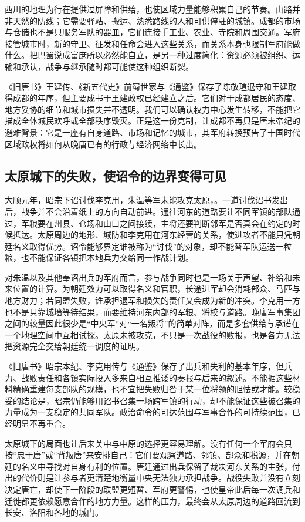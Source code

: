 西川的地理为行在提供过屏障和供给，也使区域力量能够积累自己的节奏。山路并非天然的防线；它需要驿站、搬运、熟悉路线的人和可供停驻的城镇。成都的市场与仓储也不是只服务军队的器皿，它们连接手工业、农业、寺院和周围交通。军府接管城市时，新的守卫、征发和任命会进入这些关系，而关系本身也限制军府能做什么。把巴蜀说成富庶所以必然能自立，是另一种过度简化：资源必须被组织、运输和承认，战争与继承随时都可能使这种组织断裂。

《旧唐书》王建传、《新五代史》前蜀世家与《通鉴》保存了陈敬瑄退守和王建取得成都的年序，但主要成书于王建政权已经建立之后。它们对于成都居民的态度、地方妥协的细节和城市损失并不透明。我们可以确认权力中心发生转移，不能把它描成全体城民欢呼或全部秩序毁灭。正是这一份克制，让成都不再只是唐末帝纪的避难背景：它是一座有自身道路、市场和记忆的城市，其军府转换预告了十国时代区域政权将如何从晚唐已有的行政与经济网络中长出。

\subsection{太原城下的失败，使诏令的边界变得可见}
大顺元年，昭宗下诏讨伐李克用，朱温等军未能攻克太原，。一道讨伐诏书发出后，战争并不会沿着纸上的方向自动前进。通往河东的道路要让不同军镇的部队通过，军粮要在州县、仓场和山口之间接续，主将还要判断邻军是否真会在约定的时候抵达。太原周边的地形、城防和李克用在河东经营的关系，使进攻者不能只凭朝廷名义取得优势。诏令能够界定谁被称为“讨伐”的对象，却不能替军队运送一粒粮，也不能保证各镇把本地兵力交给同一作战计划。

对朱温以及其他奉诏出兵的军府而言，参与战争同时也是一场关于声望、补给和未来位置的计算。为朝廷效力可以取得名义和官职，长途进军却会消耗部众、马匹与地方财力；若同盟失败，谁承担退军和损失的责任又会成为新的冲突。李克用一方也不是只靠城墙等待结果，而要维持河东内部的军粮、将校与道路。晚唐军事集团之间的较量因此很少是“中央军”对“一名叛将”的简单对阵，而是多套供给与承诺在一个地理空间中互相试探。太原未被攻克，不只是一次战役的败报，也是各方无法把资源完全交给朝廷统一调度的证明。

《旧唐书》昭宗本纪、李克用传与《通鉴》保存了出兵和失利的基本年序，但兵力、战败责任和各镇实际投入多来自相互推诿的奏报与后来的叙述。不能据这些材料精确重建每支部队的规模，也不宜把失败归咎于某一位将领的胆怯或才能。较稳妥的结论是，昭宗仍能够用诏书召集一场跨军镇的行动，却不能保证这些被召集的力量成为一支稳定的共同军队。政治命令的可达范围与军事合作的可持续范围，已经明显不再重合。

太原城下的局面也让后来关中与中原的选择更容易理解。没有任何一个军府会只按“忠于唐”或“背叛唐”来安排自己：它们要观察道路、邻镇、部众和税源，并在朝廷的名义中寻找对自身有利的位置。唐廷通过出兵保留了裁决河东关系的主张，付出的代价则是让参与者更清楚地衡量中央无法独力承担战争。战役失败并没有立刻决定唐亡，却使下一阶段的联盟更短暂、军府更警惕，也使皇帝此后每一次调兵和迁徙都更依赖愿意合作的地方力量。这样的压力，最终会从太原周边的道路回流到长安、洛阳和各地的城门。
